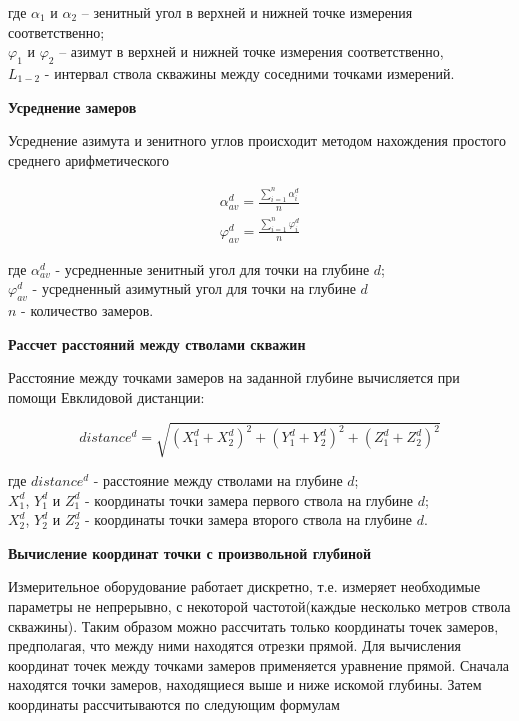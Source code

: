 где $ \alpha_1 $ и $ \alpha_2 $ – зенитный угол в верхней и нижней точке измерения соответственно;\\
$ \varphi_1 $ и $ \varphi_2 $ – азимут в верхней и нижней точке измерения соответственно,\\
$ L_{1-2} $ - интервал ствола скважины между соседними точками измерений.

\textbf{Усреднение замеров}

Усреднение азимута и зенитного углов происходит методом нахождения простого среднего арифметического

\begin{equation}
  \begin{split}
    \alpha_{av}^d = \frac{\sum\limits_{i=1}^{n} \alpha_i^d}{n}\\
    \varphi_{av}^d = \frac{\sum\limits_{i=1}^{n} \varphi_i^d}{n}
  \end{split}
\end{equation}

где $ \alpha_{av}^d $ - усредненные зенитный угол для точки на глубине $d$;\\
$ \varphi_{av}^d $ - усредненный азимутный угол для точки на глубине $d$\\
$ n $ - количество замеров.

\textbf{Рассчет расстояний между стволами скважин}

Расстояние между точками замеров на заданной глубине вычисляется при помощи Евклидовой дистанции:

\begin{equation}
  distance^d = \sqrt{(X_1^d + X_2^d)^2 + (Y_1^d + Y_2^d)^2 + (Z_1^d + Z_2^d)^2 }
\end{equation}

где $ distance^d $ - расстояние между стволами на глубине $ d $;\\
$ X_1^d $, $ Y_1^d $ и $ Z_1^d $ - координаты точки замера первого ствола на глубине $ d $;\\
$ X_2^d $, $ Y_2^d $ и $ Z_2^d $ - координаты точки замера второго ствола на глубине $ d $.

\textbf{Вычисление координат точки с произвольной глубиной}

Измерительное оборудование работает дискретно, т.е. измеряет необходимые параметры не непрерывно, с некоторой частотой(каждые несколько метров
ствола скважины). Таким образом можно рассчитать только координаты точек замеров, предполагая, что между ними находятся отрезки прямой. Для вычисления
координат точек между точками замеров применяется уравнение прямой. Сначала находятся точки замеров, находящиеся выше и ниже искомой глубины. Затем
координаты рассчитываются по следующим формулам

